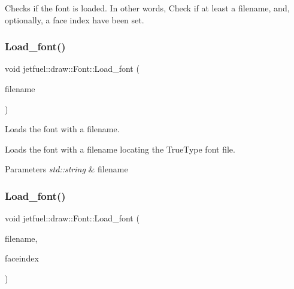 Checks if the font is loaded. In other words, Check if at least a filename, and, optionally, a face index have been set. \mbox{\label{classjetfuel_1_1draw_1_1Font_a5b6bec15a5220e34f5138fe9f1abf72e}} 
\subsubsection{\texorpdfstring{Load\+\_\+font()}{Load\_font()}\hspace{0.1cm}{\footnotesize\ttfamily [1/2]}}
{\footnotesize\ttfamily void jetfuel\+::draw\+::\+Font\+::\+Load\+\_\+font (\begin{DoxyParamCaption}\item[{const std\+::string}]{filename }\end{DoxyParamCaption})}



Loads the font with a filename. 

Loads the font with a filename locating the True\+Type font file.


\begin{DoxyParams}{Parameters}
{\em std\+::string} & filename \\
\hline
\end{DoxyParams}
\mbox{\label{classjetfuel_1_1draw_1_1Font_aac89368ac80b1dd5b7831f40af14ef2f}} 
\subsubsection{\texorpdfstring{Load\+\_\+font()}{Load\_font()}\hspace{0.1cm}{\footnotesize\ttfamily [2/2]}}
{\footnotesize\ttfamily void jetfuel\+::draw\+::\+Font\+::\+Load\+\_\+font (\begin{DoxyParamCaption}\item[{const std\+::string}]{filename,  }\item[{const long}]{faceindex }\end{DoxyParamCaption})}



